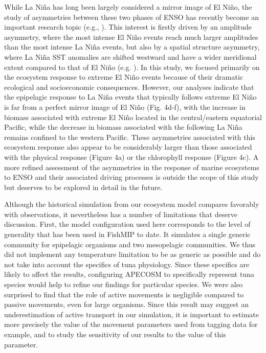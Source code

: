 While La Niña has long been largely considered a mirror image of El Niño, the study of asymmetries between these two phases of ENSO has recently become an important research topic (e.g., \citealt{phamDiversityFishesCollected2022}). This interest is firstly driven by an amplitude asymmetry, where the most intense El Niño events reach much larger amplitudes than the most intense La Niña events, but also by a spatial structure asymmetry, where La Niña SST anomalies are shifted westward and have a wider meridional extent compared to that of El Niño (e.g. \citealt{takahashiENSORegimesReinterpreting2011}). In this study, we focused primarily on the ecosystem response to extreme El Niño events because of their dramatic ecological and socioeconomic consequences. However, our analyses indicate that the epipelagic response to La Niña events that typically follows extreme El Niño is far from a perfect mirror image of El Niño (Fig. 4d-f), with the increase in biomass associated with extreme El Niño located in the central/eastern equatorial Pacific, while the decrease in biomass associated with the following La Niña remains confined to the western Pacific. These asymmetries associated with this ecosystem response also appear to be considerably larger than those associated with the physical response (Figure 4a) or the chlorophyll response (Figure 4c). A more refined assessment of the asymmetries in the response of marine ecosystems to ENSO and their associated driving processes is outside the scope of this study but deserves to be explored in detail in the future.

Although the historical simulation from our ecosystem model compares favorably with observations, it nevertheless has a number of limitations that deserve discussion. First, the model configuration used here corresponds to the level of generality that has been used in FishMIP to date. It simulates a single generic community for epipelagic organisms and two mesopelagic communities. We thus did not implement any temperature limitation to be as generic as possible and do not take into account the specifics of tuna physiology. Since these specifics are likely to affect the results, configuring APECOSM to specifically represent tuna species would help to refine our findings for particular species. We were also surprised to find that the role of active movements is negligible compared to passive movements, even for large organisms. Since this result may suggest an underestimation of active transport in our simulation, it is important to estimate more precisely the value of the movement parameters used from tagging data for example, and to study the sensitivity of our results to the value of this parameter.

